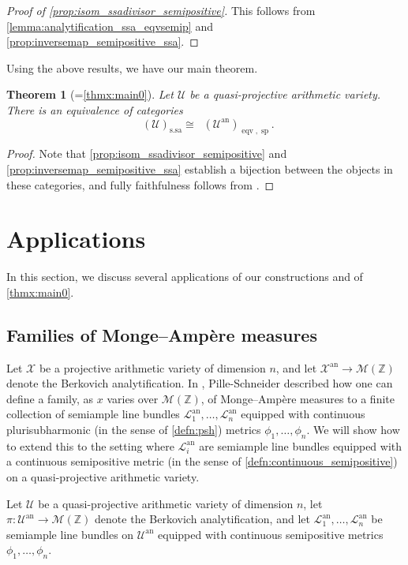 \documentclass[11pt,reqno]{amsart}
\newcommand{\mZ}{\mathbb{Z}}
\newcommand{\cX}{\mathcal{X}}
\newcommand{\cU}{\mathcal{U}}
\newcommand{\cL}{\mathcal{L}}
\newcommand{\sM}{{\mathscr M}}
\theoremstyle{theorem}
\numberwithin{equation}{subsection}
\newtheorem{theorem}[subsubsection]{Theorem}
\numberwithin{equation}{subsection}
\theoremstyle{definition}
\theoremstyle{remark}
\numberwithin{equation}{subsubsection} \numberwithin{figure}{section}
\DeclareMathOperator{\an}{an}
\DeclareMathOperator{\acPic}{\widehat{\underline{Pic}}}
\DeclareMathOperator{\semip}{sp}
\DeclareMathOperator{\eqv}{eqv}
\DeclareMathOperator{\ssa}{s.sa}
\begin{document}
\begin{proof}[Proof of \autoref{prop:isom_ssadivisor_semipositive}]
This follows from \autoref{lemma:analytification_ssa_eqvsemip} and \autoref{prop:inversemap_semipositive_ssa}. 
\end{proof}

Using the above results, we have our main theorem. 

\begin{theorem}[=\autoref{thmx:main0}]
Let $\cU$ be a quasi-projective arithmetic variety. 
There is an equivalence of categories
\[
\acPic(\cU)_{\ssa} \cong \acPic(\cU^{\an})_{\eqv, \semip}.
\]
\end{theorem}

\begin{proof}
Note that \autoref{prop:isom_ssadivisor_semipositive} and \autoref{prop:inversemap_semipositive_ssa} establish a bijection between the objects in these categories, and fully faithfulness follows from \cite[Proposition 3.4.1]{YuanZhang:AdelicLineBundles}. 
\end{proof}


\section{Applications}
\label{sec:applications}
In this section, we discuss several applications of our constructions and of \autoref{thmx:main0}. 


\subsection{Families of Monge--Amp\`ere measures}
\label{subsec:familiesMA}
Let $\cX$ be a projective arithmetic variety of dimension $n$, and let $\cX^{\an} \to \sM(\mZ)$ denote the Berkovich analytification. 
In \cite[Section 4.3]{PilleSchneider:Global}, Pille-Schneider described how one can define a family, as $x$ varies over $\sM(\mZ)$, of Monge--Amp\`ere measures to a finite collection of semiample line bundles $\cL_1^{\an},\dots,\cL_n^{\an}$ equipped with continuous plurisubharmonic (in the sense of \autoref{defn:psh}) metrics $\phi_1,\dots,\phi_n$. We will show how to extend this to the setting where $\cL_i^{\an}$ are semiample line bundles equipped with a continuous semipositive metric (in the sense of \autoref{defn:continuous_semipositive}) on a quasi-projective arithmetic variety. 


Let $\cU$ be a quasi-projective arithmetic variety of dimension $n$, let $\pi\colon \cU^{\an} \to \sM(\mZ)$ denote the Berkovich analytification, and let $\cL_1^{\an},\dots,\cL_n^{\an}$ be semiample line bundles on $\cU^{\an}$ equipped with continuous semipositive metrics $\phi_1,\dots,\phi_n$. 
\end{document}
